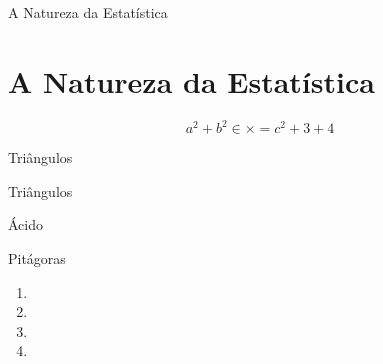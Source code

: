 \documentclass[professor]{livroabertoem}
\begin{document}
\begin{teachersection}{A Natureza da Estatística}

\lipsum[1-7]

\end{teachersection}
\section{A Natureza da Estatística}

\lipsum[1-3]


\lipsum[1]
\[
    a^2 + b^2 \in \times = c^2 + 3 + 4
\]

\begin{task}{Triângulos}

\begin{teacher}
  \lipsum[12]
  \lipsum[13]
  \lipsum[13]
\end{teacher}

\lipsum[2]
\end{task}

\lipsum[3]


\begin{example}{Triângulos}
  \lipsum[4]
\end{example}

\newpage

\begin{research}
  \lipsum[6]
\end{research}

\begin{project}
  \lipsum[7]
\end{project}


\begin{knowledge}
\lipsum[5]
\end{knowledge}

\begin{reflection}
\lipsum[6]
\end{reflection}

\begin{definition}{Ácido}
\lipsum[18]
\end{definition}
\begin{theorem}{Pitágoras}

\end{theorem}

\exercise

\begin{enumerate}
  \item \lipsum[7]
  \item \lipsum[8]
  \item \lipsum[9]
  \item \lipsum[10]
\end{enumerate}

\end{document}
